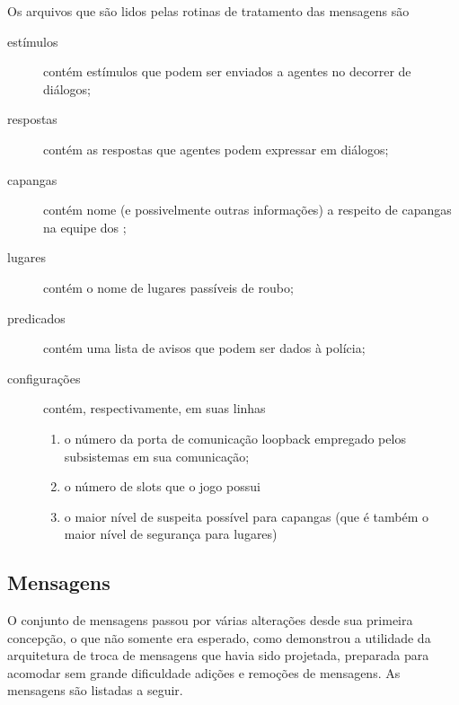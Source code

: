 Os arquivos que são lidos pelas rotinas de tratamento das mensagens são
\begin{description}
\item[estímulos] contém estímulos que podem ser enviados a agentes no decorrer de diálogos;
\item[respostas] contém as respostas que agentes podem expressar em diálogos;
\item[capangas] contém nome (e possivelmente outras informações) a respeito de capangas na equipe dos \nomeGrupo;
\item[lugares] contém o nome de lugares passíveis de roubo;
\item[predicados] contém uma lista de avisos que podem ser dados à polícia;
\item[configurações] contém, respectivamente, em suas linhas
\begin{enumerate}
\item o número da porta de comunicação loopback empregado pelos subsistemas em sua comunicação;
\item o número de slots que o jogo possui
\item o maior nível de suspeita possível para capangas (que é também o maior nível de segurança para lugares)
\end{enumerate}
\end{description}

\subsection{Mensagens}

O conjunto de mensagens passou por várias alterações desde sua primeira concepção, o que não somente era esperado, como demonstrou a utilidade da arquitetura de troca de mensagens que havia sido projetada, preparada para acomodar sem grande dificuldade adições e remoções de mensagens. As mensagens são listadas a seguir.

